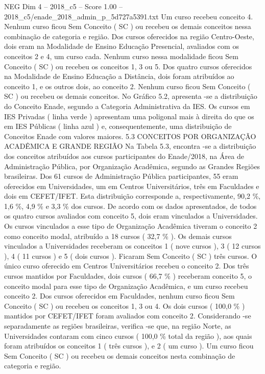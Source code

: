\begin{textsample}{NEG Dim 4 – 2018\_c5 – Score 1.00 – 2018\_c5/enade\_2018\_admin\_p\_5d727a5391.txt}
Um curso recebeu conceito 4.
Nenhum curso ficou Sem Conceito ( SC ) ou recebeu os demais conceitos nessa combinação de categoria e região.
Dos cursos oferecidos na região Centro-Oeste, dois eram na Modalidade de Ensino Educação Presencial, avaliados com os conceitos 2 e 4, um curso cada.
Nenhum curso nessa modalidade ficou Sem Conceito ( SC ) ou recebeu os conceitos 1, 3 ou 5.
Dos quatro cursos oferecidos na Modalidade de Ensino Educação a Distância, dois foram atribuídos ao conceito 1, e os outros dois, ao conceito 2.
Nenhum curso ficou Sem Conceito ( SC ) ou recebeu os demais conceitos.
No Gráfico 5.2, apresenta -se a distribuição do Conceito Enade, segundo a Categoria Administrativa da IES.
Os cursos em IES Privadas ( linha verde ) apresentam uma poligonal mais à direita do que os em IES Públicas ( linha azul ) e, consequentemente, uma distribuição de Conceitos Enade com valores maiores. 5.3 CONCEITOS POR ORGANIZAÇÃO ACADÊMICA E GRANDE REGIÃO Na Tabela 5.3, encontra -se a distribuição dos conceitos atribuídos aos cursos participantes do Enade/2018, na Área de Administração Pública, por Organização Acadêmica, segundo as Grandes Regiões brasileiras.
Dos 61 cursos de Administração Pública participantes, 55 eram oferecidos em Universidades, um em Centros Universitários, três em Faculdades e dois em CEFET/IFET.
Esta distribuição corresponde a, respectivamente, 90,2 \%, 1,6 \%, 4,9 \% e 3,3 \% dos cursos.
De acordo com os dados apresentados, de todos os quatro cursos avaliados com conceito 5, dois eram vinculados a Universidades.
Os cursos vinculados a esse tipo de Organização Acadêmica tiveram o conceito 2 como conceito modal, atribuído a 18 cursos ( 32,7 \% ).
Os demais cursos vinculados a Universidades receberam os conceitos 1 ( nove cursos ), 3 ( 12 cursos ), 4 ( 11 cursos ) e 5 ( dois cursos ).
Ficaram Sem Conceito ( SC ) três cursos.
O único curso oferecido em Centros Universitários recebeu o conceito 2.
Dos três cursos mantidos por Faculdades, dois cursos ( 66,7 \% ) receberam conceito 5, o conceito modal para esse tipo de Organização Acadêmica, e um curso recebeu conceito 2.
Dos cursos oferecidos em Faculdades, nenhum curso ficou Sem Conceito ( SC ) ou recebeu os conceitos 1, 3 ou 4.
Os dois cursos ( 100,0 \% ) mantidos por CEFET/IFET foram avaliados com conceito 2.
Considerando -se separadamente as regiões brasileiras, verifica -se que, na região Norte, as Universidades contaram com cinco cursos ( 100,0 \% total da região ), aos quais foram atribuídos os conceitos 1 ( três cursos ), e 2 ( um curso ).
Um curso ficou Sem Conceito ( SC ) ou recebeu os demais conceitos nesta combinação de categoria e região.

\end{textsample}
